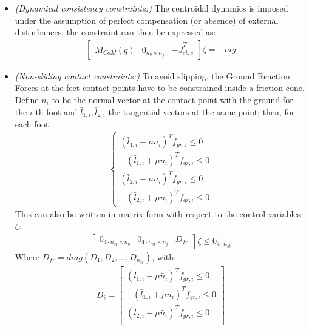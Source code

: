 \begin{itemize}
    \item \textit{(Dynamical consistency constraints:)} 
    The centroidal dynamics is imposed under the assumption of perfect compensation (or absence) of external disturbances; the constraint can then be expressed as:
    \begin{gather}\label{legged_robot_dynamic_consistency_constraint}
        \begin{bmatrix}
            M_{CoM}(q) & 0_{n_b\times n_j} & -\bar{J}_{st,c}^{T}
        \end{bmatrix}\zeta=-mg
    \end{gather}
    \item \textit{(Non-sliding contact constraints:)}
    To avoid slipping, the Ground Reaction Forces at the feet contact points have to be constrained inside a friction cone. Define $\bar{n}_{i}$ to be the normal vector at the contact point with the ground for the $i$-th foot and $\bar{l}_{1,i},\bar{l}_{2,i}$ the tangential vectors at the same point; then, for each foot:
    \begin{gather*}
        \begin{cases}
            (\bar{l}_{1,i}-\mu\bar{n}_i)^{T}f_{gr,i}\leq0\\ 
            -(\bar{l}_{1,i}+\mu\bar{n}_i)^{T}f_{gr,i}\leq0\\
            (\bar{l}_{2,i}-\mu\bar{n}_i)^{T}f_{gr,i}\leq0\\
            -(\bar{l}_{2,i}+\mu\bar{n}_i)^{T}f_{gr,i}\leq0 
        \end{cases}
    \end{gather*}
    This can also be written in matrix form with respect to the control variables $\zeta$:
    \begin{gather}\label{legged_robot_non_sliding_constraint}
        \begin{bmatrix}
            0_{4\cdot n_{st}\times n_b} & 0_{4\cdot n_{st}\times n_j} & D_{fr}
        \end{bmatrix}\zeta\leq 0_{4\cdot n_{st}}
    \end{gather}
    Where $D_{fr}=diag(D_1,D_2,\dots,D_{n_{st}})$, with:
    \begin{gather*}
        D_i=
        \begin{bmatrix}
            (\bar{l}_{1,i}-\mu\bar{n}_i)^{T}f_{gr,i}\leq0\\ 
            -(\bar{l}_{1,i}+\mu\bar{n}_i)^{T}f_{gr,i}\leq0\\
            (\bar{l}_{2,i}-\mu\bar{n}_i)^{T}f_{gr,i}\leq0\\

\end{bmatrix}
\end{gather*}
\end{itemize}
